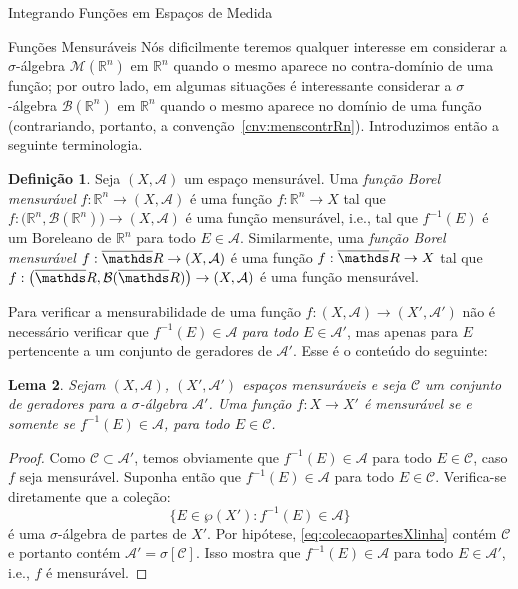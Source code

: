 \documentclass[oneside,final,11pt]{amsbook}
\newcommand{\R}{\mathds R}
\newcommand{\Borel}{\mathcal B}
\newcommand{\Lebmens}{\mathcal M}
\theoremstyle{remark}\newtheorem{exercise}{Exercício}[chapter]
\theoremstyle{remark}\newtheorem{*exercise}[exercise]{\hbox to 0pt{\hskip 0pt minus 1fil*}Exercício}
\theoremstyle{definition}\newtheorem{exdefin}{Definição}[chapter]
\theoremstyle{plain}\newtheorem{teo}{Teorema}[section]
\theoremstyle{plain}\newtheorem{lem}[teo]{Lema}
\theoremstyle{plain}\newtheorem{prop}[teo]{Proposição}
\theoremstyle{plain}\newtheorem{cor}[teo]{Corolário}
\theoremstyle{definition}\newtheorem{defin}[teo]{Definição}
\theoremstyle{remark}\newtheorem{rem}[teo]{Observação}
\theoremstyle{definition}\newtheorem{notation}[teo]{Notação}
\theoremstyle{definition}\newtheorem{convention}[teo]{Convenção}
\theoremstyle{definition}\newtheorem{example}[teo]{Exemplo}
\numberwithin{section}{chapter}
\numberwithin{equation}{section}
\begin{document}
\begin{chapter}{Integrando Funções em Espaços de Medida}
\begin{section}{Funções Mensuráveis}
Nós dificilmente teremos qualquer interesse em considerar a $\sigma$-álgebra $\Lebmens(\R^n)$
em $\R^n$ quando o mesmo aparece no contra-domínio de uma função; por outro lado, em algumas
situações é interessante considerar a $\sigma$-álgebra $\Borel(\R^n)$ em $\R^n$ quando o mesmo
aparece no domínio de uma função (contrariando, portanto, a convenção~\ref{cnv:menscontrRn}).
Introduzimos então a seguinte terminologia.
\begin{defin}\label{thm:Borelmens}
Seja $(X,\mathcal A)$ um espaço mensurável. Uma {\em função Borel mensurável\/}%
$f:\R^n\to(X,\mathcal A)$ é uma função $f:\R^n\to X$ tal que $f:\big(\R^n,\Borel(\R^n)\big)\to(X,\mathcal A)$
é uma função mensurável, i.e., tal que $f^{-1}(E)$ é um Boreleano de $\R^n$ para todo $E\in\mathcal A$.
Similarmente, uma {\em função Borel mensurável\/} $f:\overline\R\to(X,\mathcal A)$ é uma função
$f:\overline\R\to X$ tal que $f:\big(\overline\R,\Borel(\overline\R)\big)\to(X,\mathcal A)$
é uma função mensurável.
\end{defin}

Para verificar a mensurabilidade de uma função $f:(X,\mathcal A)\to(X',\mathcal A')$ não é necessário
verificar que $f^{-1}(E)\in\mathcal A$ {\em para todo\/} $E\in\mathcal A'$, mas apenas para $E$
pertencente a um conjunto de geradores de $\mathcal A'$. Esse é o conteúdo do seguinte:
\begin{lem}\label{thm:funcmensgeradores}
Sejam $(X,\mathcal A)$, $(X',\mathcal A')$ espaços mensuráveis e seja $\mathcal C$ um conjunto de geradores
para a $\sigma$-álgebra $\mathcal A'$. Uma função $f:X\to X'$ é mensurável se e somente se $f^{-1}(E)\in\mathcal A$,
para todo $E\in\mathcal C$.
\end{lem}
\begin{proof}
Como $\mathcal C\subset\mathcal A'$, temos obviamente que $f^{-1}(E)\in\mathcal A$ para todo $E\in\mathcal C$, caso
$f$ seja mensurável. Suponha então que $f^{-1}(E)\in\mathcal A$ para todo $E\in\mathcal C$.
Verifica-se diretamente que a coleção:
\begin{equation}\label{eq:colecaopartesXlinha}
\big\{E\in\wp(X'):f^{-1}(E)\in\mathcal A\big\}
\end{equation}
é uma $\sigma$-álgebra de partes de $X'$. Por hipótese, \eqref{eq:colecaopartesXlinha}
contém $\mathcal C$ e portanto contém $\mathcal A'=\sigma[\mathcal C]$.
Isso mostra que $f^{-1}(E)\in\mathcal A$ para todo $E\in\mathcal A'$, i.e., $f$ é mensurável.
\end{proof}


\end{section}
\end{chapter}
\end{document}
